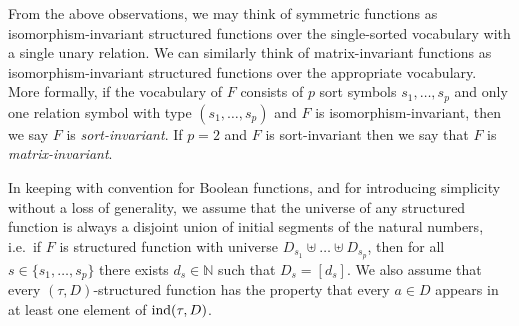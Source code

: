 \documentclass[../paper.tex]{subfiles}
\begin{document}
From the above observations, we may think of symmetric functions as
isomorphism-invariant structured functions over the single-sorted vocabulary
with a single unary relation. We can similarly think of matrix-invariant
functions as isomorphism-invariant structured functions over the appropriate
vocabulary. More formally, if the vocabulary of $F$ consists of $p$ sort symbols
$s_1, \ldots , s_p$ and only one relation symbol with type $(s_1, \ldots, s_p)$
and $F$ is isomorphism-invariant, then we say $F$ is \emph{sort-invariant}. If
$p = 2$ and $F$ is sort-invariant then we say that $F$ is
\emph{matrix-invariant}.

In keeping with convention for Boolean functions, and for introducing simplicity
without a loss of generality, we assume that the universe of any structured
function is always a disjoint union of initial segments of the natural numbers,
i.e.\ if $F$ is structured function with universe $D_{s_1} \uplus \ldots \uplus
D_{s_p}$, then for all $s \in \{s_1 , \ldots , s_p\}$ there exists $d_s \in
\mathbb{N}$ such that $D_{s} = [d_s]$. We also assume that every $(\tau,
D)$-structured function has the property that every $a \in D$ appears in at
least one element of $\text{\upshape ind}(\tau, D)$.







\end{document}
